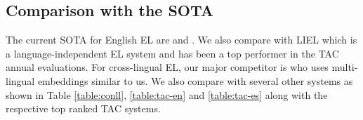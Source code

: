 \documentclass[letterpaper]{article} \usepackage{aaai18}  \usepackage{times}  \usepackage{helvet}  \usepackage{courier}  \usepackage{url}  \usepackage{graphicx}  \frenchspacing  \setlength{\pdfpagewidth}{8.5in}  \setlength{\pdfpageheight}{11in}  \usepackage{latexsym}
\begin{document}
\subsection{Comparison with the SOTA}
The current SOTA for English EL are \cite{globerson2016collective} and \cite{yamada2016joint}. We also compare with LIEL \cite{sil2016one} which is a language-independent EL system and has been a top performer in the TAC annual evaluations. For cross-lingual EL, our major competitor is \cite{tsai2016cross} who uses multi-lingual embeddings similar to us. We also compare with several other systems as shown in Table \ref{table:conll}, \ref{table:tac-en} and \ref{table:tac-es} along with the respective top ranked TAC systems.

\begin{table*}[t]
\centering
\small
{}
\end{table*}
\end{document}
